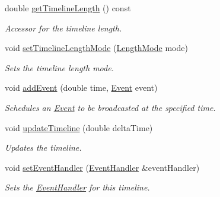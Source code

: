 \begin{DoxyCompactItemize}
\mbox{\label{class_arcana_1_1_timeline_a6b7c05ac977edfc48134ef73ad349851}} 
double \mbox{\hyperlink{class_arcana_1_1_timeline_a6b7c05ac977edfc48134ef73ad349851}{get\+Timeline\+Length}} () const
\begin{DoxyCompactList}\small\item\em Accessor for the timeline length. \end{DoxyCompactList}\item 
\mbox{\label{class_arcana_1_1_timeline_a00f122bb58c1cfdca6b9cec572944822}} 
void \mbox{\hyperlink{class_arcana_1_1_timeline_a00f122bb58c1cfdca6b9cec572944822}{set\+Timeline\+Length\+Mode}} (\mbox{\hyperlink{class_arcana_1_1_timeline_ab4605d34e12005cf268ca146751f1eed}{Length\+Mode}} mode)
\begin{DoxyCompactList}\small\item\em Sets the timeline length mode. \end{DoxyCompactList}\item 
\mbox{\label{class_arcana_1_1_timeline_ac188a005b0c36b4fe35f7e38d7998a07}} 
void \mbox{\hyperlink{class_arcana_1_1_timeline_ac188a005b0c36b4fe35f7e38d7998a07}{add\+Event}} (double time, \mbox{\hyperlink{class_arcana_1_1_event}{Event}} event)
\begin{DoxyCompactList}\small\item\em Schedules an \mbox{\hyperlink{class_arcana_1_1_event}{Event}} to be broadcasted at the specified time. \end{DoxyCompactList}\item 
\mbox{\label{class_arcana_1_1_timeline_a4de0541fc0f525373f7f1dee707a3548}} 
void \mbox{\hyperlink{class_arcana_1_1_timeline_a4de0541fc0f525373f7f1dee707a3548}{update\+Timeline}} (double delta\+Time)
\begin{DoxyCompactList}\small\item\em Updates the timeline. \end{DoxyCompactList}\item 
void \mbox{\hyperlink{class_arcana_1_1_timeline_acf36a46fcebfed3097b12e2f90ed6ccd}{set\+Event\+Handler}} (\mbox{\hyperlink{class_arcana_1_1_event_handler}{Event\+Handler}} \&event\+Handler)
\begin{DoxyCompactList}\small\item\em Sets the \mbox{\hyperlink{class_arcana_1_1_event_handler}{Event\+Handler}} for this timeline. \end{DoxyCompactList}\item 

\end{DoxyCompactItemize}
